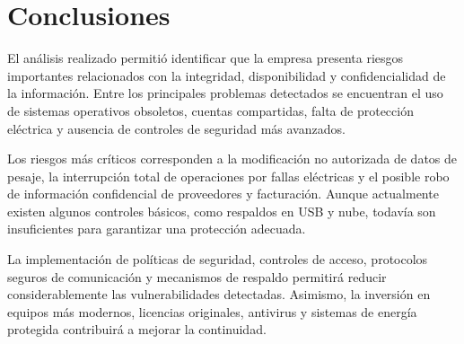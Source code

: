 \section{Conclusiones}
El análisis realizado permitió identificar que la empresa presenta riesgos importantes relacionados con la integridad, disponibilidad y confidencialidad de la información. Entre los principales problemas detectados se encuentran el uso de sistemas operativos obsoletos, cuentas compartidas, falta de protección eléctrica y ausencia de controles de seguridad más avanzados.

Los riesgos más críticos corresponden a la modificación no autorizada de datos de pesaje, la interrupción total de operaciones por fallas eléctricas y el posible robo de información confidencial de proveedores y facturación. Aunque actualmente existen algunos controles básicos, como respaldos en USB y nube, todavía son insuficientes para garantizar una protección adecuada.

La implementación de políticas de seguridad, controles de acceso, protocolos seguros de comunicación y mecanismos de respaldo permitirá reducir considerablemente las vulnerabilidades detectadas. Asimismo, la inversión en equipos más modernos, licencias originales, antivirus y sistemas de energía protegida contribuirá a mejorar la continuidad.
